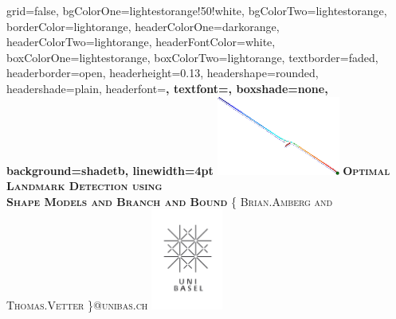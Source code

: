 \documentclass[landscape,final,a0paper,fontscale=0.27065]{baposter}
\begin{document}
\begin{poster}%
{
  grid=false,
  bgColorOne=lightestorange!50!white,
  bgColorTwo=lightestorange,
  borderColor=lightorange,
  headerColorOne=darkorange,
  headerColorTwo=lightorange,
  headerFontColor=white,
  boxColorOne=lightestorange,
  boxColorTwo=lightorange,
  textborder=faded,
  headerborder=open,
  headerheight=0.13\textheight,
  headershape=rounded,
  headershade=plain,
  headerfont=\Large\bf\textsc, %
  textfont={\setlength{\parindent}{0.5em}},
  boxshade=none,
  background=shadetb,
  linewidth=4pt
  }{\includegraphics[height=7em]{images/search_tree_ex1-crop.pdf}}{
  \bf\textsc{Optimal Landmark Detection using\\[0.2em]Shape Models and Branch and Bound}\vspace{0.5em}
  }{
    \textsc{\{ Brian.Amberg and Thomas.Vetter \}@unibas.ch}}{
      \includegraphics[height=9.0em]{images/logo}
    }
%
\newcommand{\colouredcircle}{%
  \tikz{\useasboundingbox (-0.2em,-0.32em) rectangle(0.2em,0.32em); \draw[draw=black,fill=lightblue,line width=0.03em] (0,0) circle(0.18em);}}


\end{poster}
\end{document}
